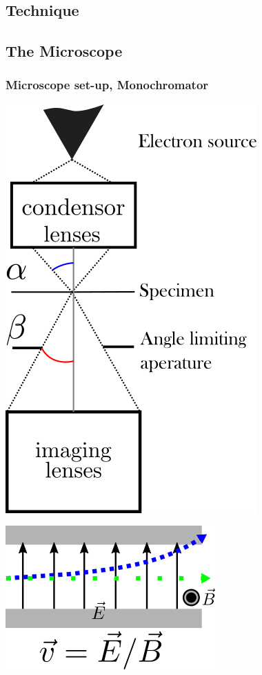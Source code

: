 \documentclass{beamer}
\begin{document}
\begin{frame}
	\section{Technique}
	\subsection{The Microscope}
	\frametitle{Microscope set-up, Monochromator}
	\begin{minipage}{0.5\linewidth}
		\centering
		\includegraphics[width=0.7\linewidth, keepaspectratio]{Figures/tem.png}
	\end{minipage}%
	\begin{minipage}{0.5\linewidth}
		\centering
		\includegraphics[width=0.7\linewidth, keepaspectratio]{Figures/monochromator.png}
	\end{minipage}
\end{frame}
\end{document}
